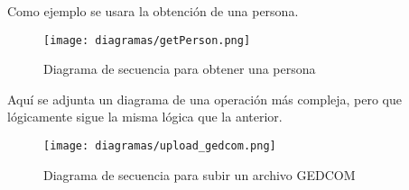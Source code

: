 Como ejemplo se usara la obtención de una persona.

\begin{figure}[ht!]
\center
\texttt{[image: diagramas/getPerson.png]}
\caption{Diagrama de secuencia para obtener una persona}
\label{fig:sequence_diagram_get_person}
\end{figure}

Aquí se adjunta un diagrama de una operación más compleja, pero que lógicamente sigue la misma lógica que la anterior.
\begin{figure}[ht!]
\center
\texttt{[image: diagramas/upload\_gedcom.png]}
\caption{Diagrama de secuencia para subir un archivo GEDCOM}
\label{fig:sequence_diagram_GEDCOM}
\end{figure}